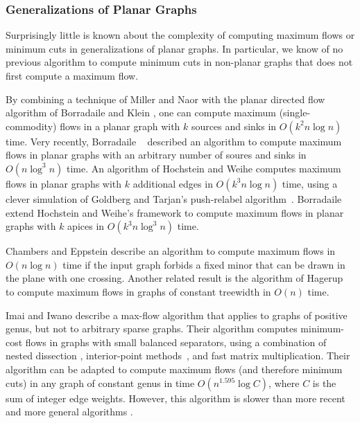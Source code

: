 \documentclass[11pt,twoside]{article}
\begin{document}
\subsubsection*{Generalizations of Planar Graphs}

Surprisingly little is known about the complexity of computing maximum flows or minimum cuts in generalizations of planar graphs.  In particular, we know of no previous algorithm to compute minimum cuts in non-planar graphs that does not first compute a maximum flow.

By combining a technique of Miller and Naor \cite{mn-fpgms-95} with the planar directed flow algorithm of Borradaile and Klein \cite{b-epnfc-08, bk-tamfd-06, bk-amfdp-09, e-mfpsp-10}, one can compute maximum (single-commodity) flows in a planar graph with $k$ sources and sinks in $O(k^2 n\log n)$ time.  Very recently, Borradaile \etal~\cite{bkmnw-msmsm-17} described an algorithm to compute maximum flows in planar graphs with an arbitrary number of soures and sinks in $O(n\log^3 n)$ time.  An algorithm of Hochstein and Weihe \cite{hw-mstfkc-07} computes maximum flows in planar graphs with $k$ additional edges in $O(k^3n\log n)$ time, using a clever simulation of Goldberg and Tarjan's push-relabel algorithm~\cite{gt-namfp-88}.  Borradaile \etal~\cite{bkmnw-msmsm-17} extend Hochstein and Weihe's framework to compute maximum flows in planar graphs with $k$ apices in $O(k^3n\log^3 n)$ time.

Chambers and Eppstein \cite{ce-focmf-13} describe an algorithm to compute maximum flows in $O(n\log n)$ time if the input graph forbids a fixed minor that can be drawn in the plane with one crossing.  Another related result is the algorithm of Hagerup \etal~\cite{hknr-cmfnc-98} to compute maximum flows in graphs of constant treewidth in $O(n)$ time.

Imai and Iwano \cite{ii-espap-90} describe a max-flow algorithm that applies to graphs of positive genus, but not to arbitrary sparse graphs.
Their algorithm computes minimum-cost flows in graphs with small balanced separators, using a combination of nested dissection \cite{lrt-gnd-79, pr-fepss-93}, interior-point methods~\cite{v-slpfm-89}, and fast matrix multiplication.
Their algorithm can be adapted to compute maximum flows (and therefore minimum cuts) in any graph of constant genus in time $O(n^{1.595}\log C)$, where $C$ is the sum of integer edge weights.
However, this algorithm is slower than more recent and more general algorithms \cite{ds-flgfi-08, gr-bfdb-98}.
\end{document}
